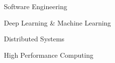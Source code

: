 \begin{cventries}
  \cvtitleentry
    {Software Engineering}

  \cvtitleentry
    {Deep Learning \& Machine Learning}

  \cvtitleentry
    {Distributed Systems}

  \cvtitleentry
    {High Performance Computing}

\end{cventries}

